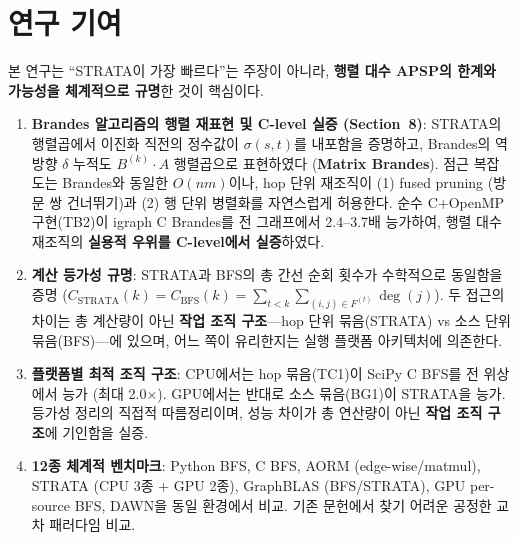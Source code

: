 \documentclass[11pt,a4paper]{article}
\begin{document}
\section{연구 기여}

\begin{keypoint}[연구 기여]

본 연구는 ``STRATA이 가장 빠르다''는 주장이 아니라, \textbf{행렬 대수 APSP의 한계와 가능성을 체계적으로 규명}한 것이 핵심이다.

\begin{enumerate}[leftmargin=1.4em]
  \item \textbf{Brandes 알고리즘의 행렬 재표현 및 C-level 실증 (Section~8)}: STRATA의 행렬곱에서 이진화 직전의 정수값이 $\sigma(s,t)$를 내포함을 증명하고, Brandes의 역방향 $\delta$ 누적도 $B^{(k)} \cdot A$ 행렬곱으로 표현하였다 (\textbf{Matrix Brandes}). 점근 복잡도는 Brandes와 동일한 $O(nm)$이나, hop 단위 재조직이 (1) fused pruning (방문 쌍 건너뛰기)과 (2) 행 단위 병렬화를 자연스럽게 허용한다. 순수 C+OpenMP 구현(TB2)이 igraph C Brandes를 전 그래프에서 2.4--3.7배 능가하여, 행렬 대수 재조직의 \textbf{실용적 우위를 C-level에서 실증}하였다.

  \item \textbf{계산 등가성 규명}: STRATA과 BFS의 총 간선 순회 횟수가 수학적으로 동일함을 증명 ($C_{\text{STRATA}}(k) = C_{\text{BFS}}(k) = \sum_{t<k} \sum_{(i,j) \in F^{(t)}} \deg(j)$). 두 접근의 차이는 총 계산량이 아닌 \textbf{작업 조직 구조}---hop 단위 묶음(STRATA) vs 소스 단위 묶음(BFS)---에 있으며, 어느 쪽이 유리한지는 실행 플랫폼 아키텍처에 의존한다.

  \item \textbf{플랫폼별 최적 조직 구조}: CPU에서는 hop 묶음(TC1)이 SciPy C BFS를 전 위상에서 능가 (최대 2.0$\times$). GPU에서는 반대로 소스 묶음(BG1)이 STRATA을 능가. 등가성 정리의 직접적 따름정리이며, 성능 차이가 총 연산량이 아닌 \textbf{작업 조직 구조}에 기인함을 실증.

  \item \textbf{12종 체계적 벤치마크}: Python BFS, C BFS, AORM (edge-wise/matmul), STRATA (CPU 3종 + GPU 2종), GraphBLAS (BFS/STRATA), GPU per-source BFS, DAWN을 동일 환경에서 비교. 기존 문헌에서 찾기 어려운 공정한 교차 패러다임 비교.


\end{enumerate}
\end{keypoint}
\end{document}
